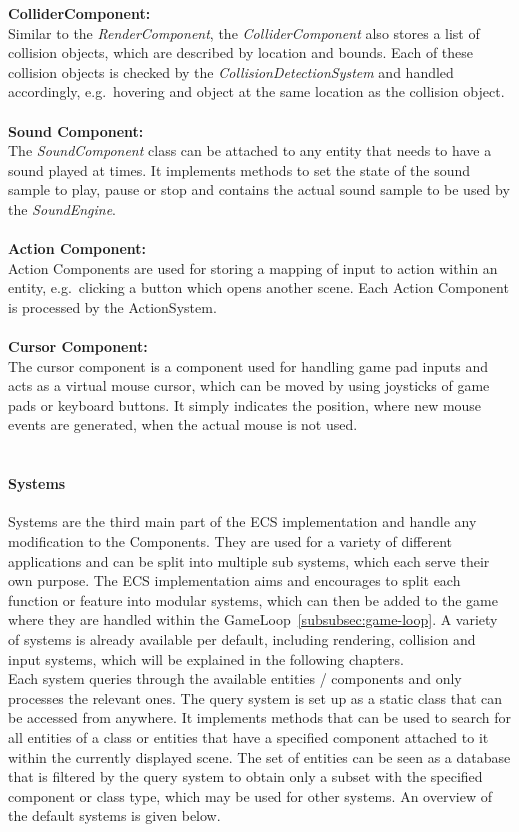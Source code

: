 \textbf{ColliderComponent:} \\
Similar to the \textit{RenderComponent}, the \textit{ColliderComponent} also stores a list of collision objects, which are described by location and bounds.
Each of these collision objects is checked by the \textit{CollisionDetectionSystem} and handled accordingly, e.g.\
hovering and object at the same location as the collision object. \\ \\

\textbf{Sound Component:} \\
The \textit{SoundComponent} class can be attached to any entity that needs to have a sound played at times.
It implements methods to set the state of the sound sample to play, pause or stop and contains the actual sound sample to be used by the \textit{SoundEngine}. \\ \\

\textbf{Action Component:} \\
Action Components are used for storing a mapping of input to action within an entity, e.g.\ clicking a button which opens another scene.
Each Action Component is processed by the ActionSystem. \\ \\

\textbf{Cursor Component:} \\
The cursor component is a component used for handling game pad inputs and acts as a virtual mouse cursor, which can be moved by using
joysticks of game pads or keyboard buttons.
It simply indicates the position, where new mouse events are generated, when the actual mouse is not used. \\ \\

\paragraph{Systems}
Systems are the third main part of the ECS implementation and handle any modification to the Components.
They are used for a variety of different applications and can be split into multiple sub systems, which each serve their own purpose.
The ECS implementation aims and encourages to split each function or feature into modular systems, which can then be added to the game where they are handled within the GameLoop~\ref{subsubsec:game-loop}.
A variety of systems is already available per default, including rendering, collision and input systems, which will be explained in the following chapters.
\\
Each system queries through the available entities / components and only processes the relevant ones.
The query system is set up as a static class that can be accessed from anywhere.
It implements methods that can be used to search for all entities of a class or entities that have a specified component
attached to it within the currently displayed scene.
The set of entities can be seen as a database that is filtered by the query system to obtain only a subset with the specified component or class type, which may be used
for other systems. \todo{add graphic with database of ecs}
An overview of the default systems is given below.

